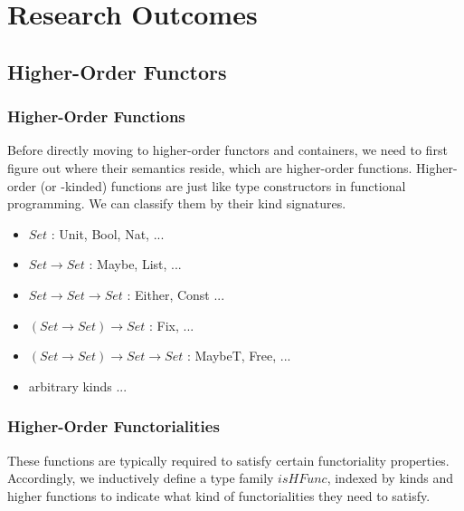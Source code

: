 \chapter{Research Outcomes}


\section{Higher-Order Functors}

\subsection{Higher-Order Functions}

Before directly moving to higher-order functors and containers, we need to first figure out where their semantics reside, which are higher-order functions. Higher-order (or -kinded) functions are just like type constructors in functional programming. We can classify them by their kind signatures.

\begin{itemize}
  \item{$Set$ : Unit, Bool, Nat, ...} 
  \item{$Set \to Set$ : Maybe, List, ...}
  \item{$Set \to Set \to Set$ : Either, Const ...}
  \item{$(Set \to Set) \to Set$ : Fix, ...}
  \item{$(Set \to Set) \to Set \to Set$ : MaybeT, Free, ...}
  \item{arbitrary kinds ...}
\end{itemize}

\subsection{Higher-Order Functorialities}

These functions are typically required to satisfy certain functoriality properties. Accordingly, we inductively define a type family $isHFunc$, indexed by kinds and higher functions to indicate what kind of functorialities they need to satisfy.

